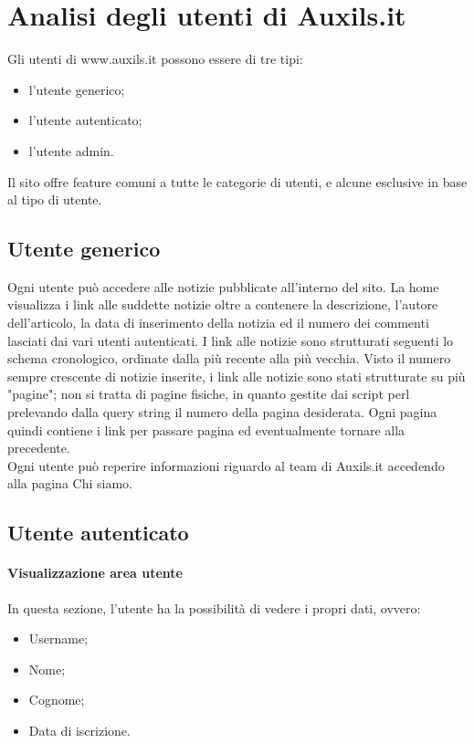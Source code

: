 \section{Analisi degli utenti di Auxils.it}
Gli utenti di www.auxils.it possono essere di tre tipi:
\begin{itemize}
 \item l'utente generico;
 \item l'utente autenticato;
 \item l'utente admin.
\end{itemize}

Il sito offre feature comuni a tutte le categorie di utenti, e alcune esclusive in base al tipo di utente.

\subsection{Utente generico}

Ogni utente può accedere alle notizie pubblicate all'interno del sito. La home visualizza i link alle suddette notizie oltre a contenere la descrizione, l'autore dell'articolo, la data di inserimento della notizia ed il numero dei commenti lasciati dai vari utenti autenticati. I link alle notizie sono strutturati seguenti lo schema cronologico, ordinate dalla più recente alla più vecchia.
Visto il numero sempre crescente di notizie inserite, i link alle notizie sono stati strutturate su più "pagine"; non si tratta di pagine fisiche, in quanto gestite dai script perl prelevando dalla query string il numero della pagina desiderata.
Ogni pagina quindi contiene i link per passare pagina ed eventualmente tornare alla precedente.\\
Ogni utente può reperire informazioni riguardo al team di Auxils.it accedendo alla pagina Chi siamo.

\subsection{Utente autenticato}

\paragraph{Visualizzazione area utente}
In questa sezione, l'utente ha la possibilità di vedere i propri dati, ovvero:
\begin{itemize}
	\item Username;
	\item Nome;
	\item Cognome;
	\item Data di iscrizione.
\end{itemize}

